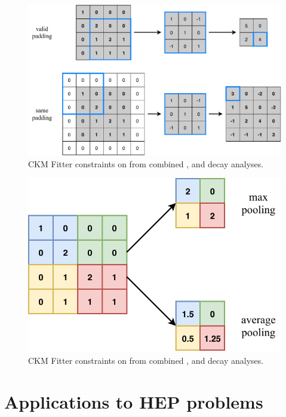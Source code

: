 \begin{figure}
    \includegraphics[width=\textwidth]{diagrams/6-cvn/conv_operation.pdf}
    \caption[CKM Fitter constraints on \alphaCKM.]%
    {CKM Fitter constraints on \alphaCKM from combined \BToPiPi,
        \BToRhoPi and \BToRhoRho decay analyses.}
    \label{fig:conv_operation}
\end{figure}

\begin{figure}
    \includegraphics[width=\largefigwidth]{diagrams/6-cvn/pooling.pdf}
    \caption[CKM Fitter constraints on \alphaCKM.]%
    {CKM Fitter constraints on \alphaCKM from combined \BToPiPi,
        \BToRhoPi and \BToRhoRho decay analyses.}
    \label{fig:pooling}
\end{figure}



\section{Applications to HEP problems}

